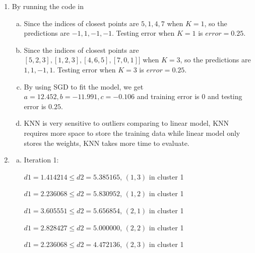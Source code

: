 \documentclass[11pt]{article}
\begin{document}
\begin{enumerate}
\begin{enumerate}[a.]
			Since $Pr(\text{Popularity = 'P' $|$ Price = '\$', Delivery = 'Yes' , Cuisine = 'Korean'}) > Pr(\text{Popularity = 'NP' $|$ Price = '\$', Delivery = 'Yes' , Cuisine = 'Korean'})$, we classify this tuple as \textbf{popular}.
			\item We can train $n$ Naive Bayes classifiers each with randomly sampled data from the original dataset and make decision by majority vote.
			\item Since the number of positive samples are small, we want to make sure that the naive Bayes classifier just label all data as negative, thus, we choose
			\[\text{Recall} = \frac{\text{True positive}}{\text{True positive} + \text{False negative}}\]
			
			to be our metric.
		\end{enumerate}
		\item By running the code in 
			\begin{enumerate}[a.]
				\item Since the indices of closest points are $5, 1, 4, 7$ when $K = 1$, so the predictions are $-1, 1, -1, -1$. Testing error when $K = 1$ is $error = 0.25$.
				\item Since the indices of closest points are $[5, 2, 3], [1, 2, 3], [4, 6, 5], [7, 0, 1]]$ when $K = 3$, so the predictions are $1, 1, -1, 1$. Testing error when $K = 3$ is $error = 0.25$.
				\item By using SGD to fit the model, we get $a = 12.452, b = -11.991, c = -0.106$ and training error is $0$ and testing error is $0.25$.
				\item KNN is very sensitive to outliers comparing to linear model, KNN requires more space to store the training data while linear model only stores the weights, KNN takes more time to evaluate.
			\end{enumerate}
			\item 
			\begin{enumerate}[a.]
				\item
				Iteration 1:

	$d1 = 1.414214 \leq d2 = 5.385165$, $(1, 3)$ in cluster 1

	$d1 = 2.236068 \leq d2 = 5.830952$, $(1, 2)$ in cluster 1

	$d1 = 3.605551 \leq d2 = 5.656854$, $(2, 1)$ in cluster 1

	$d1 = 2.828427 \leq d2 = 5.000000$, $(2, 2)$ in cluster 1

	$d1 = 2.236068 \leq d2 = 4.472136$, $(2, 3)$ in cluster 1


\end{enumerate}
\end{enumerate}
\end{document}
